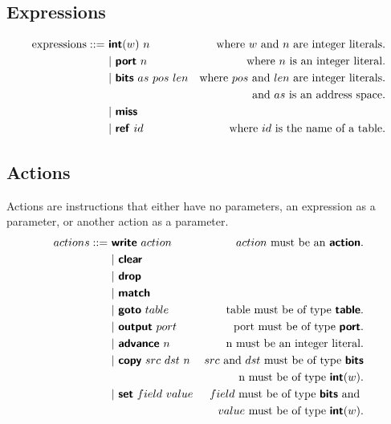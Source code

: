 \subsection{Expressions}
\begin{align*}
  \text{expressions} ::=~& \bm{\mathsf{{int}}}(w) \ n    & \text{where} \ w \ \text{and} \ n \ \text{are integer literals.}\\
  & | \ \bm{\mathsf{{port}}} \ n   & \text{where } n \text{ is an integer literal.}\\
  & | \ \bm{\mathsf{{bits}}} \ as \ pos \ len &\text{where } pos \text{ and } len \text{ are integer literals.} \\ & &\text{and } as \text{ is an address space.}\\
  & | \ \bm{\mathsf{{miss}}}\\
  & | \ \bm{\mathsf{{ref}}} \ id    &\text{where } id \text{ is the name of a table.}
\end{align*}
\subsection{Actions}

Actions are instructions that either have no parameters, an expression as a parameter, or another action as a parameter.
\begin{align*}
actions::=~&  \bm{\mathsf{{write}}} \ action     & action \text{ must be an } \bm{\mathsf{{action}}}.\\
  & | \ \bm{\mathsf{{clear}}}\\
  & | \ \bm{\mathsf{{drop}}}\\
  & | \ \bm{\mathsf{{match}}}\\
  & | \ \bm{\mathsf{{goto}}} \ table             & \text{table must be of type } \bm{\mathsf{{table}}}.\\
  & | \ \bm{\mathsf{{output}}} \ port            & \text{port must be of type } \bm{\mathsf{{port}}}.\\
  & | \ \bm{\mathsf{{advance}}} \ n              & \text{n must be an integer literal.}\\
  & | \ \bm{\mathsf{{copy}}} \ src \ dst \ n       & src \text{ and } dst \text{ must be of type } \bm{\mathsf{{bits}}} \\
                                         && \text{n must be of type } \bm{\mathsf{{int}}}(w).\\
  & | \ \bm{\mathsf{{set}}} \ field \ value        & field \text{ must be of type } \bm{\mathsf{{bits}}} \text{ and }\\
                                         && value \text{ must be of type } \bm{\mathsf{{int}}}(w).
\end{align*}
